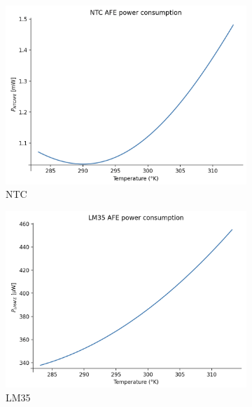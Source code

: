 \documentclass[12pt]{article}
\begin{document}
    \begin{figure}[H]
        \centering
        \begin{subfigure}{0.45\textwidth}
            \centering
            \includegraphics[width=\textwidth]{images/PowerNTC.png}
            \caption{ NTC }
        \end{subfigure}\hfill
        \begin{subfigure}{0.45\textwidth}
            \centering
            \includegraphics[width=\textwidth]{images/PowerLM.png}
            \caption{ LM35 }
        \end{subfigure}\
        \begin{subfigure}{0.45\textwidth}
            \centering

\end{subfigure}
\end{figure}
\end{document}
